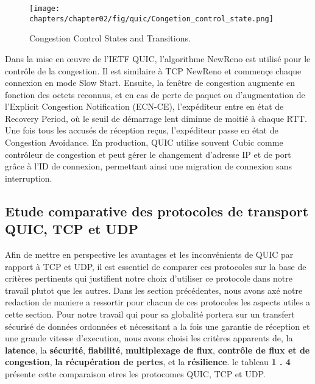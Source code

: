\begin{figure}[H]
    \centering
    \texttt{[image: chapters/chapter02/fig/quic/Congetion\_control\_state.png]}
    \caption{Congestion Control States and Transitions.\cite{alawaji2021ietf}}
    \label{fig:gen}
\end{figure}

Dans la mise en œuvre de l'IETF QUIC, l'algorithme NewReno est utilisé pour le contrôle de la congestion. Il est similaire à TCP NewReno et commençe chaque connexion en mode Slow Start. Ensuite, la fenêtre de congestion augmente en fonction des octets reconnus, et en cas de perte de paquet ou d'augmentation de l'Explicit Congestion Notification (ECN-CE), l'expéditeur entre en état de Recovery Period, où le seuil de démarrage lent diminue de moitié à chaque RTT. Une fois tous les accusés de réception reçus, l'expéditeur passe en état de Congestion Avoidance. En production, QUIC utilise souvent Cubic comme contrôleur de congestion et peut gérer le changement d'adresse IP et de port grâce à l'ID de connexion, permettant ainsi une migration de connexion sans interruption.

\subsection{Etude comparative des protocoles de transport QUIC, TCP et UDP}

Afin de mettre en perspective les avantages et les inconvénients de QUIC par rapport à TCP et UDP, il est essentiel de comparer ces protocoles sur la base de critères pertinents qui justifient notre choix d'utiliser ce protocole dans notre travail plutot que les autres. Dans les section précédentes, nous avons axé notre redaction de maniere a ressortir pour chacun de ces protocoles les aspects utiles a cette section. Pour notre travail qui pour sa globalité portera sur un transfert sécurisé de données ordonnées et nécessitant a la fois une garantie de réception et une grande vitesse d'execution, nous avons choisi les critères apparents de, la \textbf{latence}, la \textbf{sécurité}, \textbf{fiabilité}, \textbf{multiplexage de flux}, \textbf{contrôle de flux et de congestion}, \textbf{la récupération de pertes}, et la \textbf{résilience}. le tableau \textbf{1 . 4} présente cette comparaison etres les protocomes QUIC, TCP et UDP.

